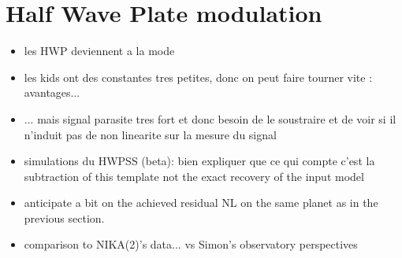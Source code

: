 
\section{Half Wave Plate modulation}

\begin{itemize}
\item les HWP deviennent a la mode
\item les kids ont des constantes tres petites, donc on peut faire tourner vite
  : avantages...
\item ... mais signal parasite tres fort et donc besoin de le soustraire et de
  voir si il n'induit pas de non linearite sur la mesure du signal
\item simulations du HWPSS (beta): bien expliquer que ce qui compte c'est la
  subtraction of this template not the exact recovery of the input model
\item anticipate a bit on the achieved residual NL on the same planet as in the
  previous section.
\item comparison to NIKA(2)'s data... vs Simon's observatory perspectives
\end{itemize}
